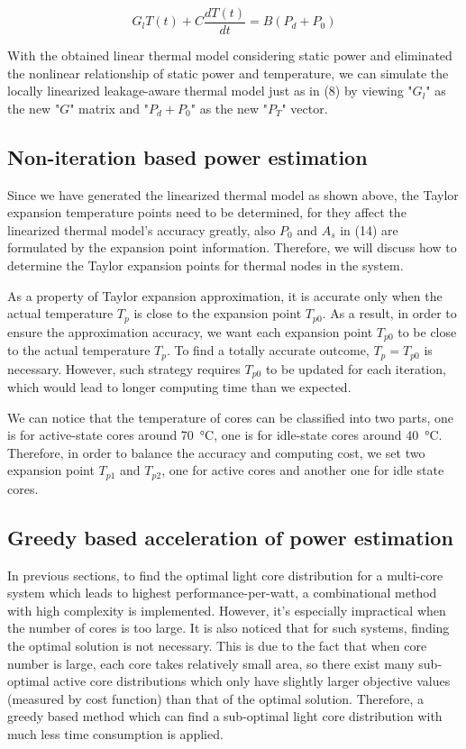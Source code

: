 \begin{equation}\label{gt=bp}
G_{l}T(t) + C\frac{dT(t)}{dt} = B(P_{d} + P_{0})
\end{equation}

With the obtained linear thermal model considering static power and eliminated the nonlinear relationship of static power and temperature, we can simulate the locally linearized leakage-aware thermal model just as in (8) by viewing "$G_{l}$" as the new "$G$" matrix and "$P_{d} + P_{0}$" as the new "$P_{T}$" vector.

\subsection{Non-iteration based power estimation}
Since we have generated the linearized thermal model as shown above, the Taylor expansion temperature points need to be determined, for they affect the linearized thermal model's accuracy greatly, also $P_{0}$ and $A_{s}$ in (14) are formulated by the expansion point information. Therefore, we will discuss how to determine the Taylor expansion points for thermal nodes in the system. 

As a property of Taylor expansion approximation, it is accurate only when the actual temperature $T_{p}$ is close to the expansion point $T_{p0}$. As a result, in order to ensure the approximation accuracy, we want each expansion point $T_{p0}$ to be close to the actual temperature $T_{p}$. To find a totally accurate outcome, $T_{p} = T_{p0}$ is necessary. However, such strategy requires $T_{p0}$ to be updated for each iteration, which would lead to longer computing time than we expected.

We can notice that the temperature of cores can be classified into two parts, one is for active-state cores around \SI{70}{\degreeCelsius}, one is for idle-state cores around \SI{40}{\degreeCelsius}. Therefore, in order to balance the accuracy and computing cost, we set two expansion point $T_{p1}$ and $T_{p2}$, one for active cores and another one for idle state cores.

\subsection{Greedy based acceleration of power estimation}
In previous sections, to find the optimal light core distribution for a multi-core system which leads to highest performance-per-watt, a combinational method with high complexity is implemented. However, it's  especially impractical when the number of cores is too large. It is also noticed that for such systems, finding the optimal solution is not necessary. This is due to the fact that when core number is large, each core takes relatively small area, so there exist many sub-optimal active core distributions which only have slightly larger objective values (measured by cost function) than that of the optimal solution. Therefore, a greedy based method which can find a sub-optimal light core distribution with much less time consumption is applied. 

